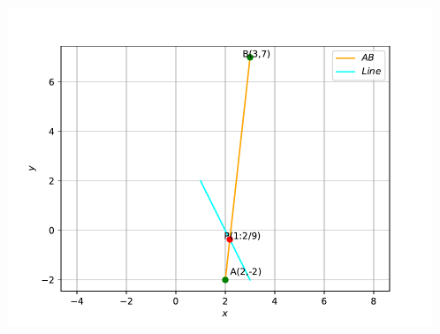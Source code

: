 \documentclass[journal,12pt,twocolumn]{IEEEtran}
\begin{document}
\begin{figure}[!h]
\centering
\includegraphics[width=\columnwidth]{chapters/10/7/4/1/figs/vec.pdf}
\caption{}
\label{fig:chapters/10/7/4/1vec}
\end{figure}
\end{document}
